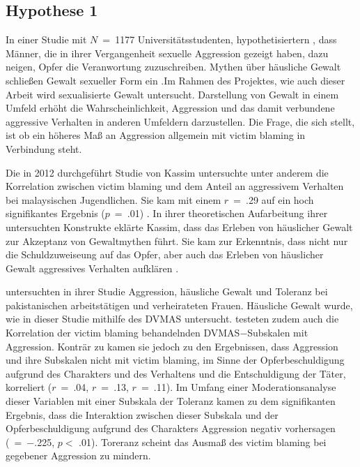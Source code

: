 \subsection{Hypothese 1}  \label{subsec_2.2.1}
In einer Studie mit $N$~=~1177 Universitätsstudenten, hypothetisiertern \textcite{H1_1993}, dass Männer, die in ihrer Vergangenheit sexuelle Aggression gezeigt haben, dazu neigen, Opfer die Veranwortung zuzuschreiben. Mythen über häusliche Gewalt schließen Gewalt sexueller Form ein \parencite{H1_Poli_2022}.Im Rahmen des Projektes, wie auch dieser Arbeit wird sexualisierte Gewalt untersucht. Darstellung von Gewalt in einem Umfeld erhöht die Wahrscheinlichkeit, Aggression und das damit verbundene aggressive Verhalten in anderen Umfeldern darzustellen. Die Frage, die sich stellt, ist ob ein höheres Maß an Aggression allgemein mit victim blaming in Verbindung steht.

Die in 2012 durchgeführt Studie von Kassim untersuchte unter anderem die Korrelation zwischen victim blaming und dem Anteil an aggressivem Verhalten bei malaysischen Jugendlichen. Sie kam mit einem $r$~=~.29 auf ein hoch signifikantes Ergebnis ($p$~=~.01) \parencite{H1_malasia_2012}. In ihrer theoretischen Aufarbeitung ihrer untersuchten Konstrukte eklärte Kassim, dass das Erleben von häuslicher Gewalt zur Akzeptanz von Gewaltmythen führt. Sie kam zur Erkenntnis, dass nicht nur die Schuldzuweiseung auf das Opfer, aber auch das Erleben von häuslicher Gewalt aggressives Verhalten aufklären \parencite{H1_malasia_2012}.

\textcite{H1_moderation_2020} untersuchten in ihrer Studie Aggression, häusliche Gewalt und Toleranz bei pakistanischen arbeitstätigen und verheirateten Frauen. Häusliche Gewalt wurde, wie in dieser Studie mithilfe des DVMAS untersucht. \textcite{H1_moderation_2020} testeten zudem auch die Korrelation der victim blaming behandelnden DVMAS$-$Subskalen mit Aggression. Konträr zu \textcite{H1_malasia_2012} kamen sie jedoch zu den Ergebnissen, dass Aggression und ihre Subskalen nicht mit victim blaming, im Sinne der Opferbeschuldigung aufgrund des Charakters und des Verhaltens und die Entschuldigung der Täter, korreliert ($r$~=~.04, $r$~=~.13, $r$~=~.11). Im Umfang einer Moderationsanalyse dieser Variablen mit einer Subskala der Toleranz kamen \textcite{H1_moderation_2020} zu dem signifikanten Ergebnis, dass die Interaktion zwischen dieser Subskala und der Opferbeschuldigung aufgrund des Charakters Aggression negativ vorhersagen (\textbeta~=~$-$.225, $p<$ .01). Toreranz scheint das Ausmaß des victim blaming bei gegebener Aggression zu mindern.


